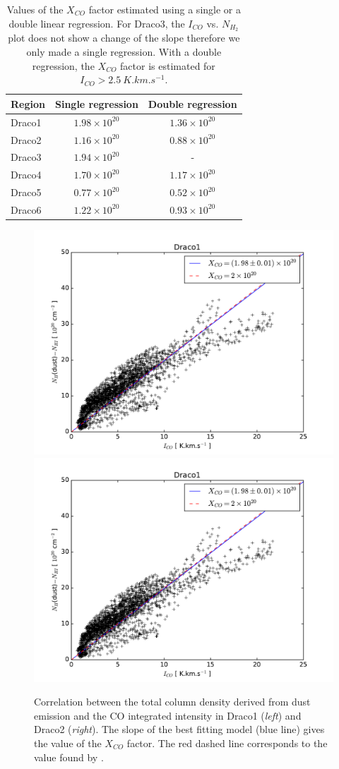 \documentclass[traditabstract]{aa}
\begin{document}
\begin{table}[h]
  \centering
  \footnotesize
  \begin{tabular}{lcc}
    \hline \hline
    Region &  Single regression   &  Double regression   \\ \hline 
    Draco1 & $1.98\times 10^{20}$ & $1.36\times 10^{20}$ \\
    Draco2 & $1.16\times 10^{20}$ & $0.88\times 10^{20}$ \\
    Draco3 & $1.94\times 10^{20}$ &          -           \\
    Draco4 & $1.70\times 10^{20}$ & $1.17\times 10^{20}$ \\
    Draco5 & $0.77\times 10^{20}$ & $0.52\times 10^{20}$ \\
    Draco6 & $1.22\times 10^{20}$ & $0.93\times 10^{20}$ \\ \hline
  \end{tabular}
  \caption{\label{table:Xco} Values of the $X_{CO}$ factor estimated using a single or a double linear regression. For Draco3, the $I_{CO}$ vs. $N_{H_2}$ plot does not show a change of the slope therefore we only made a single regression. With a double regression, the $X_{CO}$ factor is estimated for $I_{CO}>2.5\: K.km.s^{-1}$.}
\end{table}

\begin{figure}[h!]
  \centering
  \includegraphics[page=1,width=0.48\linewidth,trim=30 10 50 30,clip=true]{Figures/dust-CO_comparison.pdf}
  \hspace{3mm}
  \includegraphics[page=2,width=0.48\linewidth,trim=30 10 50 30,clip=true]{Figures/dust-CO_comparison.pdf}
  \caption{\label{Xco} Correlation between the total column density derived from dust emission and the CO integrated intensity in Draco1 (\emph{left}) and Draco2 (\emph{right}). The slope of the best fitting model (blue line) gives the value of the $X_{CO}$ factor. The red dashed line corresponds to the value found by \cite{Moritz_1998}.}
\end{figure}
\end{document}
